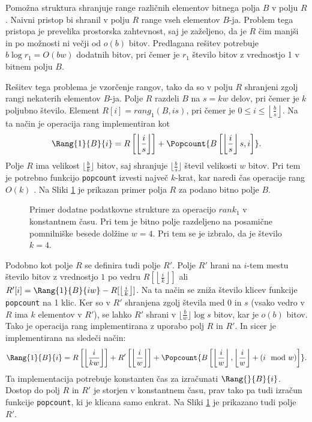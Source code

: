 Pomožna struktura shranjuje range različnih elementov bitnega polja $B$ v polju $R$. Naivni pristop bi shranil v polju $R$ range vseh elementov $B$-ja. Problem tega pristopa je prevelika prostorska zahtevnost, saj je zaželjeno, da je $R$ čim manjši in po možnosti ni večji od $o(b)$ bitov. Predlagana rešitev potrebuje $b\log{r_1}=O(bw)$ dodatnih bitov, pri čemer je $r_1$ število bitov z vrednostjo 1 v bitnem polju $B$.

Rešitev tega problema je vzorčenje rangov, tako da so v polju $R$ shranjeni zgolj rangi nekaterih elementov $B$-ja. Polje $R$ razdeli $B$ na $s=kw$ delov, pri čemer je $k$ poljubno število. Element $R[i]=rang_1(B,is)$, pri čemer je $0\le i \le \left\lfloor\frac{b}{s} \right\rfloor$. Na ta način je operacija rang implementiran kot 
\begin{equation*}
    \Rang{1}{B}{i}=R\left[\left\lfloor\frac{i}{s} \right\rfloor\right] + \Popcount{B\left[\left\lfloor\frac{i}{s} \right\rfloor s,i\right]}.
\end{equation*}
Polje $R$ ima velikost $\lfloor\frac{b}{k}\rfloor$ bitov, saj shranjuje $\lfloor\frac{b}{s}\rfloor$ števil velikosti $w$ bitov. Pri tem je potrebno funkcijo \texttt{popcount} izvesti največ $k$-krat, kar naredi čas operacije rang $O(k)$ \cite{Navarro2016}. Na Sliki \ref{fig:rank} je prikazan primer polja $R$ za podano bitno polje $B$.

\begin{figure}[htb]
    \begin{center}
        
        \caption{Primer dodatne podatkovne strukture za operacijo $rank_1$ v konstantnem času. Pri tem je bitno polje razdeljeno na posamične pomnilniške besede dolžine $w=4$. Pri tem se je izbralo, da je število $k=4$.} 
        \label{fig:rank}
    \end{center}
\end{figure}

Podobno kot polje $R$ se definira tudi polje $R'$. Polje $R'$ hrani na $i$-tem mestu število bitov z vrednostjo $1$ po vedru $R[\left\lfloor\frac{i}{k} \right\rfloor]$ ali $R'[i]=\Rang{1}{B}{iw}-R[\left\lfloor\frac{i}{k} \right\rfloor]$. Na ta način se zniža število klicev funkcije \texttt{popcount} na 1 klic. Ker so v $R'$ shranjena zgolj števila med 0 in $s$ (vsako vedro v $R$ ima $k$ elementov v $R'$), se lahko $R'$ shrani v $\lfloor\frac{b}{w}\rfloor\log{s}$ bitov, kar je $o(b)$ bitov. Tako je operacija rang implementirana z uporabo polj $R$ in $R'$. In sicer je implementirana na sledeči način:
\begin{equation*}
    \Rang{1}{B}{i}=R\left[\left\lfloor\frac{i}{kw} \right\rfloor\right]+ R'\left[\left\lfloor\frac{i}{w} \right\rfloor\right]+\Popcount{B\left[\left\lfloor\frac{i}{w} \right\rfloor,\left\lfloor\frac{i}{w} \right\rfloor+(i \mod w)\right]}.
\end{equation*}
Ta implementacija potrebuje konstanten čas za izračunati $\Rang{}{B}{i}$. Dostop do polj $R$ in $R'$ je storjen v konstantnem času, prav tako pa  tudi izračun funkcije \texttt{popcount}, ki je klicana samo enkrat\cite{Navarro2016}. Na Sliki \ref{fig:rank} je prikazano tudi polje $R'$.


